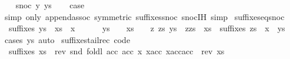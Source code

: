 \begin{isabellebody}
\isamarkupfalse%
\isanewline
\ \ \isamarkupfalse%
\ {\isacharparenleft}snoc\ y\ ys{\isacharparenright}\isanewline
\ \ \isamarkupfalse%
\ {\isacharquery}case\isanewline
\ \ \ \ \isamarkupfalse%
\ {\isacharparenleft}simp\ only{\isacharcolon}\ append{\isachardot}assoc\ {\isacharbrackleft}symmetric{\isacharbrackright}\ suffixes{\isacharunderscore}snoc\ snoc{\isachardot}IH{\isacharparenright}\ simp\isanewline
{}\isamarkupfalse%
%
\endisatagproof
{\isafoldproof}%
%
\isadelimproof
\isanewline
%
\endisadelimproof
\isanewline
{}\isamarkupfalse%
\ suffixes{\isacharunderscore}eq{\isacharunderscore}snoc{\isacharcolon}\isanewline
\ \ {\isachardoublequoteopen}suffixes\ ys\ {\isacharequal}\ xs\ {\isacharat}\ {\isacharbrackleft}x{\isacharbrackright}\ {\isasymlongleftrightarrow}\isanewline
\ \ \ \ \ {\isacharparenleft}ys\ {\isacharequal}\ {\isacharbrackleft}{\isacharbrackright}\ {\isasymand}\ xs\ {\isacharequal}\ {\isacharbrackleft}{\isacharbrackright}\ {\isasymor}\ {\isacharparenleft}{\isasymexists}z\ zs{\isachardot}\ ys\ {\isacharequal}\ z{\isacharhash}zs\ {\isasymand}\ xs\ {\isacharequal}\ suffixes\ zs{\isacharparenright}{\isacharparenright}\ {\isasymand}\ x\ {\isacharequal}\ ys{\isachardoublequoteclose}\isanewline
%
\isadelimproof
\ \ %
\endisadelimproof
%
\isatagproof
{}\isamarkupfalse%
\ {\isacharparenleft}cases\ ys{\isacharparenright}\ auto%
\endisatagproof
{\isafoldproof}%
%
\isadelimproof
\isanewline
%
\endisadelimproof
\isanewline
{}\isamarkupfalse%
\ suffixes{\isacharunderscore}tailrec\ {\isacharbrackleft}code{\isacharbrackright}{\isacharcolon}\ \isanewline
\ \ {\isachardoublequoteopen}suffixes\ xs\ {\isacharequal}\ rev\ {\isacharparenleft}snd\ {\isacharparenleft}foldl\ {\isacharparenleft}{\isasymlambda}{\isacharparenleft}acc{}{\isacharcomma}\ acc{}{\isacharparenright}\ x{\isachardot}\ {\isacharparenleft}x{\isacharhash}acc{}{\isacharcomma}\ {\isacharparenleft}x{\isacharhash}acc{}{\isacharparenright}{\isacharhash}acc{}{\isacharparenright}{\isacharparenright}\ {\isacharparenleft}{\isacharbrackleft}{\isacharbrackright}{\isacharcomma}{\isacharbrackleft}{\isacharbrackleft}{\isacharbrackright}{\isacharbrackright}{\isacharparenright}\ {\isacharparenleft}rev\ xs{\isacharparenright}{\isacharparenright}{\isacharparenright}{\isachardoublequoteclose}\isanewline
%
\isadelimproof
%
\endisadelimproof
%
\isatagproof
{}\isamarkupfalse%
\ {\isacharminus}\isanewline
\ \ \isamarkupfalse%

\end{isabellebody}
